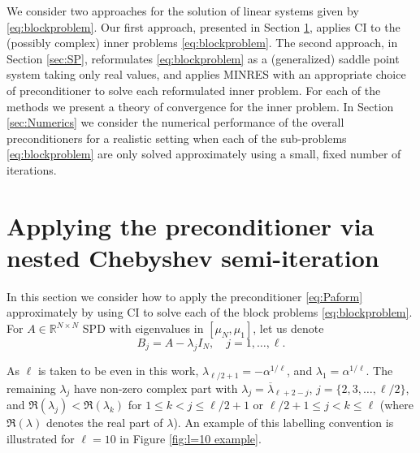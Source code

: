 \documentclass{article}
\newcommand{\sizeA}{N}
\theoremstyle{definition}
\begin{document}
{		
		{We consider two approaches for the solution of linear systems given by \eqref{eq:blockproblem}}. Our first approach, presented in Section \ref{sec:ApproxPrecond}, applies CI to the (possibly complex) inner problems \eqref{eq:blockproblem}. The second approach, in Section \ref{sec:SP}, reformulates \eqref{eq:blockproblem} as a (generalized) saddle point system taking only real values, and applies MINRES \cite{PaigeSaunders} with an appropriate choice of preconditioner to solve each reformulated inner problem.  For each of the methods we present a theory of convergence for the inner problem. In Section \ref{sec:Numerics} we consider the numerical performance of the overall preconditioners for a realistic setting when each of the sub-problems \eqref{eq:blockproblem} are only solved approximately using a small, fixed number of iterations.
		
		
		
		\section{Applying the preconditioner via nested Chebyshev semi-iteration}\label{sec:ApproxPrecond}
		In this section we consider how to apply the preconditioner \eqref{eq:Paform} approximately by using CI to solve each of the block problems \eqref{eq:blockproblem}. For $A\in\mathbb{R}^{\sizeA \times \sizeA}$ SPD with eigenvalues in $[\mu_{N},\mu_1]$, let us denote 
		\begin{equation}\label{eq:B definition}
			B_j = {A} - \lambda_j I_\sizeA, \quad {j = 1, \ldots, \ell}.
		\end{equation}
		
		As $\ell$ is taken to be even in this work, $\lambda_{\ell/2+1} = -\alpha^{1/\ell}$, and {$\lambda_1 = \alpha^{1/\ell}$}. The remaining $\lambda_j$ have non-zero complex part with $\lambda_j = \overline{\lambda}_{\ell+2-j}$, $j =\{2,3, \ldots, \ell/2 \}$, and $\Re(\lambda_j)<\Re(\lambda_k)$ for $1\le k < j\le \ell/2+1$ or $\ell/2+1\le j<k\le \ell$ (where $\Re(\lambda)$ denotes the real part of $\lambda$). An example of this labelling convention is illustrated for $\ell =10$ in Figure \ref{fig:l=10 example}.
		
}
\end{document}
